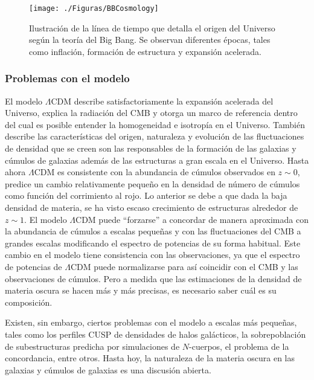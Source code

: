 \documentclass[a4paper,openright,12pt]{book}
\begin{document}
\begin{figure}
\centering
  \texttt{[image: ./Figuras/BBCosmology]}
  \caption{\footnotesize{Ilustración de la línea de tiempo que detalla el origen del Universo según la teoría del Big Bang. Se observan diferentes épocas, tales como inflación, formación de estructura y expansión acelerada.}}
  \label{fig 1.6}
\end{figure}



\subsubsection*{Problemas con el modelo}
El modelo $\Lambda$CDM describe satisfactoriamente la expansión acelerada del Universo, explica la radiación del CMB y otorga un marco de referencia dentro del cual es posible entender la homogeneidad e isotropía en el Universo. También describe las características del origen, naturaleza y evolución de las fluctuaciones de densidad que se creen son las responsables de la formación de las galaxias y cúmulos de galaxias además de las estructuras a gran escala en el Universo. Hasta ahora $\Lambda$CDM es consistente con la abundancia de cúmulos observados en $z \sim 0$, predice un cambio relativamente pequeño en la densidad de número de cúmulos como función del corrimiento al rojo. Lo anterior se debe a que dada la baja densidad de materia, se ha visto escaso crecimiento de estructuras alrededor de $z \sim 1$. El modelo $\Lambda$CDM puede ``forzarse'' a concordar de manera aproximada con la abundancia de cúmulos a escalas pequeñas y con las fluctuaciones del CMB a grandes escalas modificando el espectro de potencias de su forma habitual. Este cambio en el modelo tiene consistencia con las observaciones, ya que el espectro de potencias de $\Lambda$CDM puede normalizarse para así coincidir con el CMB y las observaciones de cúmulos. Pero a medida que las estimaciones de la densidad de materia oscura se hacen más y más precisas, es necesario saber cuál es su composición.

Existen, sin embargo, ciertos problemas con el modelo a escalas más pequeñas, tales como los perfiles CUSP de densidades de halos galácticos, la sobrepoblación de subestructuras predicha por simulaciones de $N$-cuerpos, el problema de la concordancia, entre otros. Hasta hoy, la naturaleza de la materia oscura en las galaxias y cúmulos de galaxias es una discusión abierta.
\end{document}
